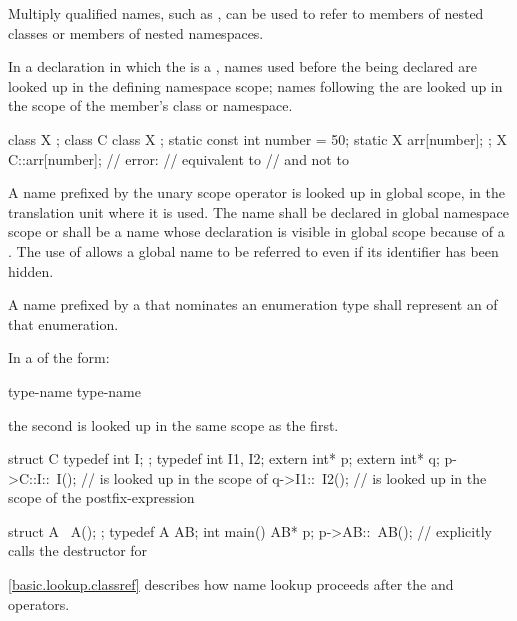 \pnum
\begin{note}
Multiply qualified names, such as , can
be used to refer to members of nested classes or
members of nested namespaces.
\end{note}

\pnum
In a declaration in which the  is a
, names used before the 
being declared are looked up in the defining namespace scope; names
following the  are looked up in the scope of the
member's class or namespace.
\begin{example}
\begin{codeblock}
class X { };
class C {
  class X { };
  static const int number = 50;
  static X arr[number];
};
X C::arr[number];   // error:
                    // equivalent to  
                    // and not to  
\end{codeblock}
\end{example}

\pnum
{}%
%
A name prefixed by the unary scope operator \tcode{::}
is looked up in global scope, in the translation unit where it is used.
The name shall be declared in global namespace scope or shall be a name
whose declaration is visible in global scope because of a
. The use of \tcode{::}
allows a global name to be referred to even if its identifier has been
hidden.

\pnum
A name prefixed by a  that
nominates an enumeration type shall represent an 
of that enumeration.

\pnum
In a  of the form:

\begin{ncbnf}
 type-name \terminal{::} \terminal{\~} type-name
\end{ncbnf}
the second  is looked up in the same scope as the first.
\begin{example}
\begin{codeblock}
struct C {
  typedef int I;
};
typedef int I1, I2;
extern int* p;
extern int* q;
p->C::I::~I();      //  is looked up in the scope of 
q->I1::~I2();       //  is looked up in the scope of the postfix-expression

struct A {
  ~A();
};
typedef A AB;
int main() {
  AB* p;
  p->AB::~AB();     // explicitly calls the destructor for 
}
\end{codeblock}
\end{example}
\begin{note}
\ref{basic.lookup.classref} describes how name
lookup proceeds after the  and \tcode{->} operators.
\end{note}

